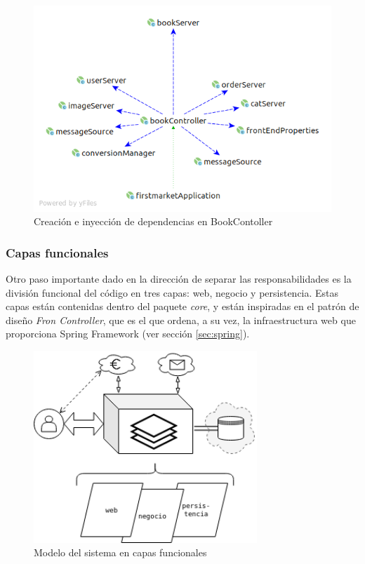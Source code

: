 \documentclass[a4paper]{article}
\begin{document}
	\begin{figure}[htb!]
		\centering
		\includegraphics[width=\textwidth]{di_bookController}
		\caption{Creación e inyección de dependencias en BookContoller}
		\label{fig:di_bookController}
	\end{figure}
    
    \subsubsection{Capas funcionales} \label{sec:design_layer}
    Otro paso importante dado en la dirección de separar las responsabilidades es la división funcional del código en tres capas: web, negocio y persistencia. Estas capas están contenidas dentro del paquete \emph{core}, y están inspiradas en el patrón de diseño \emph{Fron Controller}, que es el que ordena, a su vez, la infraestructura web que proporciona Spring Framework (ver sección \ref{sec:spring}).
    
    \begin{figure}[htb!]
    	\centering
    	\includegraphics[width=0.75\textwidth,keepaspectratio]{desing_layer}
    	\caption{Modelo del sistema en capas funcionales}
    	\label{fig:desing_layer}
    \end{figure}
    
\end{document}
